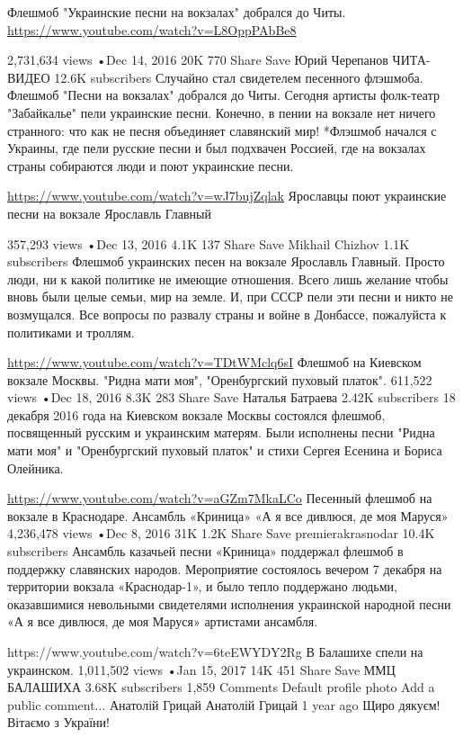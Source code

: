 Флешмоб "Украинские песни на вокзалах" добрался до Читы.
\url{https://www.youtube.com/watch?v=L8OppPAbBe8}

2,731,634 views
•Dec 14, 2016
20K
770
Share
Save
Юрий Черепанов ЧИТА-ВИДЕО
12.6K subscribers
Случайно стал свидетелем песенного флэшмоба.
Флешмоб "Песни на вокзалах" добрался до Читы. 
Сегодня артисты фолк-театр "Забайкалье" пели украинские песни. Конечно, в пении на вокзале нет ничего странного: что как не песня объединяет славянский мир! 
*Флэшмоб начался с Украины, где пели русские песни и был подхвачен Россией, где на вокзалах страны собираются люди и поют украинские песни.

\url{https://www.youtube.com/watch?v=wJ7bujZqlak}
Ярославцы поют украинские песни на вокзале Ярославль Главный

357,293 views
•Dec 13, 2016
4.1K
137
Share
Save
Mikhail Chizhov
1.1K subscribers
Флешмоб украинских песен на вокзале Ярославль Главный. Просто люди, ни к какой политике не имеющие отношения. Всего лишь желание чтобы вновь были целые семьи, мир на земле. И, при СССР пели эти песни и никто не возмущался. Все вопросы по развалу страны и войне в Донбассе, пожалуйста к политиками и троллям.

\url{https://www.youtube.com/watch?v=TDtWMclq6sI}
Флешмоб на Киевском вокзале Москвы. "Ридна мати моя", "Оренбургский пуховый платок".
611,522 views
•Dec 18, 2016
8.3K
283
Share
Save
Наталья Батраева
2.42K subscribers
18 декабря 2016 года на Киевском вокзале Москвы состоялся флешмоб, посвященный русским и украинским матерям.
Были исполнены песни "Ридна мати моя" и "Оренбургский пуховый платок" и стихи Сергея Есенина и Бориса Олейника.

\url{https://www.youtube.com/watch?v=aGZm7MkaLCo}
Песенный флешмоб на вокзале в Краснодаре. Ансамбль «Криница» «А я все дивлюся, де моя Маруся»
4,236,478 views
•Dec 8, 2016
31K
1.2K
Share
Save
premierakrasnodar
10.4K subscribers
Ансамбль казачьей песни «Криница» поддержал флешмоб в поддержку славянских народов. Мероприятие состоялось вечером 7 декабря на территории вокзала «Краснодар-1», и было тепло поддержано людьми, оказавшимися невольными свидетелями исполнения украинской народной песни «А я все дивлюся, де моя Маруся» артистами ансамбля.

https://www.youtube.com/watch?v=6teEWYDY2Rg
В Балашихе спели на украинском.
1,011,502 views
•Jan 15, 2017
14K
451
Share
Save
ММЦ БАЛАШИХА
3.68K subscribers
1,859 Comments
Default profile photo
Add a public comment...
Анатолій Грицай
Анатолій Грицай
1 year ago
Щиро дякуєм! Вітаємо з України! 


